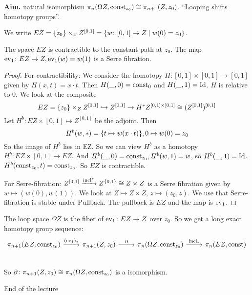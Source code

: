 \documentclass[language=english]{TemplateLecture}
\begin{document}
\textbf{Aim.} natural isomorphism \(\pi_n(\Omega Z, \operatorname{const}_{z_0}) \cong \pi_{n+1}(Z, z_0)\). \enquote{Looping shifts homotopy groups}.

We write \(EZ = \{z_0\} \times_Z Z^{[0,1]} = \{w\colon [0,1] \to Z \mid w(0) = z_0\}\).

\begin{proposition}
    The space \(EZ\) is contractible to the constant path at \(z_0\). The map \(\mathrm{ev}_1\colon EZ \to Z, \mathrm{ev}_1(w) = w(1)\) is a Serre fibration.
\end{proposition}

\begin{proof}
    For contractibility: We consider the homotopy \(H\colon [0,1] \times [0,1] \to [0,1]\) given by \(H(x,t) = x \cdot t\). Then \(H(\_, 0) = \operatorname{const}_0\) and \(H(\_, 1) = \operatorname{Id}\). \(H\) is relative to \(0\). We look at the composite
    \[EZ = \{z_0\}\times_Z Z^{[0,1]} \hookrightarrow Z^{[0,1]} \to H^* Z^{[0,1] \times [0,1]} \cong (Z^{[0,1]})^{[0,1]}\]
    Let \(H^b \colon EZ \times [0,1] \mapsto Z^[0,1]\) be the adjoint. Then
    \[H^b(w, *) = \{t \mapsto w(x\cdot t)\}, 0 \mapsto w(0) = z_0\]
    So the image of \(H^b\) lies in EZ.
    So we can view \(H^b\) as a homotopy \(H^b \colon EZ \times [0,1] \to EZ\). And \(H^b(\_, 0) = \operatorname{const}_{z_0}, H^b(w,1) = w\), so \(H^b(\_,1) = \operatorname{Id}\). \(H^b(\operatorname{const}_{z_0}, t) = \operatorname{const}_{z_0}\). So \(EZ\) is contractible.

    For Serre-fibration: \(Z^{[0,1]} \xrightarrow{\operatorname{incl}^*} Z^{\{0,1\}} \cong Z \times Z\) is a Serre fibration given by \(w \mapsto(w(0), w(1))\). We look at \(Z \mapsto Z\times Z\), \(z \mapsto (z_0, z)\). We use that Serre-fibration is stable under Pullback. The pullback is \(EZ\) and the map is \(\mathrm{ev}_1\).
\end{proof}

The loop space \(\Omega Z\) is the fiber of \(\mathrm{ev}_1\colon EZ \to Z\) over \(z_0\). So we get a long exact homotopy group sequence:
\[\begin{tikzcd}
    \pi_{n+1}(EZ, \const_{z_0}) \ar[r, "(\ev_1)_*"] & \pi_{n+1}(Z, z_0) \ar[r, "\partial"] & \pi_n(\Omega Z, \const_{z_0}) \ar[r, "\incl_*"] & \pi_n(EZ, \const) \\
\end{tikzcd}\]
So \(\partial\colon \pi_{n+1}(Z, z_0) \cong \pi_n(\Omega Z, \operatorname{const}_{z_0})\) is a isomorphism.

End of the lecture
\end{document}
